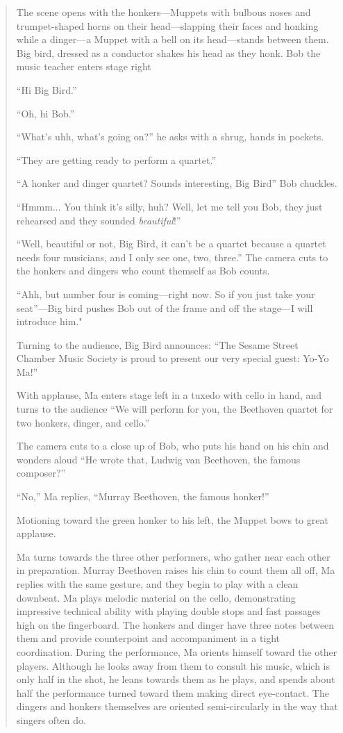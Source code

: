 \documentclass[12pt,letterpaper]{article}
\begin{document}
	\begin{quote}

	\ttfamily

	The scene opens with the honkers---Muppets with bulbous noses and
	trumpet-shaped horns on their head---slapping their faces and honking 
	while a dinger---a Muppet with a bell on its head---stands between them.
	Big bird, dressed as a conductor shakes his head as they honk. Bob the
	music teacher enters stage right 

	``Hi Big Bird.''

	``Oh, hi Bob.''

	``What's uhh, what's going on?'' he asks with a shrug, hands in pockets.

	``They are getting ready to perform a quartet.''

	``A honker and dinger quartet? Sounds interesting, Big Bird'' Bob 
	chuckles.

	``Hmmm... You think it's silly, huh? Well, let me tell you Bob, they 
	just rehearsed and they sounded \textit{beautiful}!''

	``Well, beautiful or not, Big Bird, it can't be a quartet because a 
	quartet needs four musicians, and I only see one, two, three.'' The 
	camera cuts to the honkers and dingers who count themself as Bob counts.

	``Ahh, but number four is coming---right now. So if you just take your 
	seat''---Big bird pushes Bob out of the frame and off the stage---I will
	introduce him."

	Turning to the audience, Big Bird announces: ``The Sesame Street Chamber
	Music Society is proud to present our very special guest: Yo-Yo Ma!''

	With applause, Ma enters stage left in a tuxedo with cello in hand, and
	turns to the audience ``We will perform for you, the Beethoven quartet 
	for two honkers, dinger, and cello.'' 

	The camera cuts to a close up of Bob, who puts his hand on his chin and 	wonders aloud ``He wrote that, Ludwig van Beethoven, the famous 
	composer?''

	``No,'' Ma replies, ``Murray Beethoven, the famous honker!''

	Motioning toward the green honker to his left, the Muppet bows to great 
	applause.

	Ma turns towards the three other performers, who gather near each other
	in preparation. Murray Beethoven raises his chin to count them all off, 
	Ma replies with the same gesture, and they begin to play with a clean 
	downbeat. Ma plays melodic material on the cello, demonstrating 
	impressive technical ability with playing double stops and fast 
	passages high on the fingerboard. The honkers and dinger have three
	notes between them and provide counterpoint and accompaniment in a tight
	coordination. During the performance, Ma orients himself toward the 
	other players. Although he looks away from them to consult his music, 
	which is only half in the shot, he leans towards them as he plays, and 
	spends about half the performance turned toward them making direct 
	eye-contact. The dingers and honkers themselves are oriented 
	semi-circularly in the way that singers often do.


\end{quote}
\end{document}
